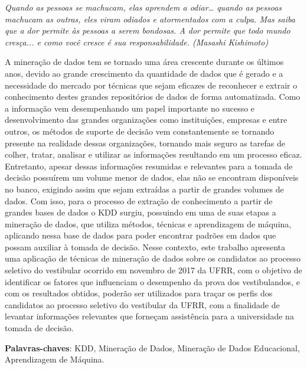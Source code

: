 \documentclass[
	12pt,				%
    oneside,			%
	a4paper,			%
	chapter=TITLE,		%
	english,			%
	brazil				%
	]{abntex2}
\begin{document}
\begin{epigrafe}
    \vspace*{\fill}
	\begin{flushright}
		\textit{Quando as pessoas se machucam, elas aprendem a odiar… quando as pessoas machucam as outras, eles viram odiados e atormentados com a culpa. Mas saiba que a dor permite às pessoas a serem bondosas. A dor permite que todo mundo cresça... e como você cresce é sua responsabilidade. (Masashi Kishimoto)}
	\end{flushright}
\end{epigrafe}


\setlength{\absparsep}{18pt} %
\begin{resumo}
    A mineração de dados tem se tornado uma área crescente durante os últimos anos, devido ao grande crescimento da quantidade de dados que é gerado e a necessidade do mercado por técnicas que sejam eficazes de reconhecer e extrair o conhecimento destes grandes repositórios de dados de forma automatizada. Como a informação vem desempenhando um papel importante no sucesso e desenvolvimento das grandes organizações como instituições, empresas e entre outros, os métodos de suporte de decisão vem constantemente se tornando presente na realidade dessas organizações, tornando mais seguro as tarefas de colher, tratar, analisar e utilizar as informações resultando em um processo eficaz. Entretanto, apesar dessas informações resumidas e relevantes para a tomada de decisão possuírem um volume menor de dados, elas não se encontram disponíveis no banco, exigindo assim que sejam extraídas a partir de grandes volumes de dados. Com isso, para o processo de extração de conhecimento a partir de grandes bases de dados o KDD surgiu, possuindo em uma de suas etapas a mineração de dados, que utiliza métodos, técnicas e aprendizagem de máquina, aplicando nessa base de dados para poder encontrar padrões em dados que possam auxiliar à tomada de decisão. Nesse contexto, este trabalho apresenta uma aplicação de técnicas de mineração de dados sobre os candidatos ao processo seletivo do vestibular ocorrido em novembro de 2017 da UFRR, com o objetivo de identificar os fatores que influenciam o desempenho da prova dos vestibulandos, e com os resultados obtidos, poderão ser utilizados para traçar os perfis dos candidatos ao processo seletivo do vestibular da UFRR, com a finalidade de levantar informações relevantes que forneçam assistência para a universidade na tomada de decisão.

 \vspace{\onelineskip}
 
 \noindent 
 \textbf{Palavras-chaves}: KDD, Mineração de Dados, Mineração de Dados Educacional, Aprendizagem de Máquina.
\end{resumo}
\end{document}
